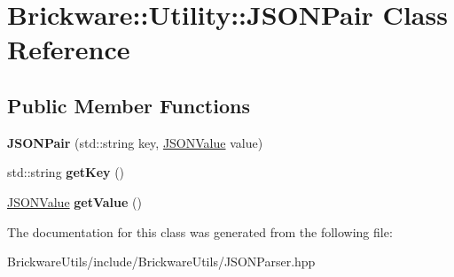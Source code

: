 \hypertarget{classBrickware_1_1Utility_1_1JSONPair}{}\section{Brickware\+:\+:Utility\+:\+:J\+S\+O\+N\+Pair Class Reference}
\label{classBrickware_1_1Utility_1_1JSONPair}
\subsection*{Public Member Functions}
\begin{DoxyCompactItemize}
\item 
\hypertarget{classBrickware_1_1Utility_1_1JSONPair_a4eb63d8db8ef75751e1c019c290be85c}{}{\bfseries J\+S\+O\+N\+Pair} (std\+::string key, \hyperlink{unionBrickware_1_1Utility_1_1JSONValue}{J\+S\+O\+N\+Value} value)\label{classBrickware_1_1Utility_1_1JSONPair_a4eb63d8db8ef75751e1c019c290be85c}

\item 
\hypertarget{classBrickware_1_1Utility_1_1JSONPair_abee75a220a67566e0896218edc5b081c}{}std\+::string {\bfseries get\+Key} ()\label{classBrickware_1_1Utility_1_1JSONPair_abee75a220a67566e0896218edc5b081c}

\item 
\hypertarget{classBrickware_1_1Utility_1_1JSONPair_aa05cbbd1cf0ea55327ee3ed36ac2dc88}{}\hyperlink{unionBrickware_1_1Utility_1_1JSONValue}{J\+S\+O\+N\+Value} {\bfseries get\+Value} ()\label{classBrickware_1_1Utility_1_1JSONPair_aa05cbbd1cf0ea55327ee3ed36ac2dc88}

\end{DoxyCompactItemize}


The documentation for this class was generated from the following file\+:\begin{DoxyCompactItemize}
\item 
Brickware\+Utils/include/\+Brickware\+Utils/J\+S\+O\+N\+Parser.\+hpp\end{DoxyCompactItemize}
